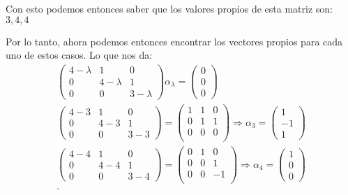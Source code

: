 \documentclass[12pt]{exam}
\begin{document}
\begin{enumerate}
\begin{enumerate}
    Con esto podemos entonces saber que los valores propios de esta matriz son: $3, 4, 4$
    
    Por lo tanto, ahora podemos entonces encontrar los vectores propios para cada uno de estos casos. Lo que nos
    da:
    \begin{align*}
        \begin{pmatrix} 
            4 - \lambda & 1 & 0 \\
            0 & 4 - \lambda & 1 \\
            0 & 0 & 3 - \lambda 
        \end{pmatrix} \alpha_\lambda = \begin{pmatrix} 0 \\ 0 \\ 0 \end{pmatrix} \\
        \begin{pmatrix} 
            4 - 3 & 1 & 0 \\
            0 & 4 - 3 & 1 \\
            0 & 0 & 3 - 3 
            \end{pmatrix} = \begin{pmatrix}
            1 & 1 & 0 \\
            0 & 1 & 1 \\
            0 & 0 & 0 \\
        \end{pmatrix} \Rightarrow \alpha_3 = \begin{pmatrix} 1 \\ -1 \\ 1 \end{pmatrix} \\
        \begin{pmatrix} 
            4 - 4 & 1 & 0 \\
            0 & 4 - 4 & 1 \\
            0 & 0 & 3 - 4 
            \end{pmatrix} = \begin{pmatrix}
            0 & 1 & 0 \\
            0 & 0 & 1 \\
            0 & 0 & -1 \\
        \end{pmatrix} \Rightarrow \alpha_4 = \begin{pmatrix} 1 \\ 0 \\ 0 \end{pmatrix} \\
    .\end{align*}



\end{enumerate}
\end{enumerate}
\end{document}
